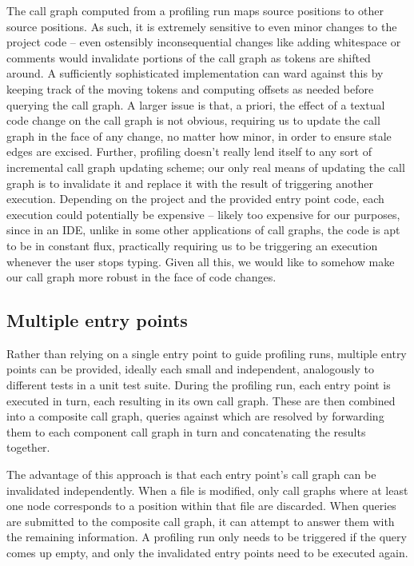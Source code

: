 The call graph computed from a profiling run maps source positions to other
source positions. As such, it is extremely sensitive to even minor changes to
the project code -- even ostensibly inconsequential changes like adding
whitespace or comments would invalidate portions of the call graph as tokens
are shifted around. A sufficiently sophisticated implementation can ward
against this by keeping track of the moving tokens and computing offsets as
needed before querying the call graph. A larger issue is that, a priori, the
effect of a textual code change on the call graph is not obvious, requiring us
to update the call graph in the face of any change, no matter how minor, in
order to ensure stale edges are excised. Further, profiling doesn't really lend
itself to any sort of incremental call graph updating scheme; our only real
means of updating the call graph is to invalidate it and replace it with the
result of triggering another execution. Depending on the project and the
provided entry point code, each execution could potentially be expensive --
likely too expensive for our purposes, since in an IDE, unlike in some other
applications of call graphs, the code is apt to be in constant flux,
practically requiring us to be triggering an execution whenever the user stops
typing. Given all this, we would like to somehow make our call graph more
robust in the face of code changes.

\subsection{Multiple entry points}

Rather than relying on a single entry point to guide profiling runs, multiple
entry points can be provided, ideally each small and independent, analogously
to different tests in a unit test suite. During the profiling run, each entry
point is executed in turn, each resulting in its own call graph. These are then
combined into a composite call graph, queries against which are resolved by
forwarding them to each component call graph in turn and concatenating the
results together.

The advantage of this approach is that each entry point's call graph can be
invalidated independently. When a file is modified, only call graphs where at
least one node corresponds to a position within that file are discarded. When
queries are submitted to the composite call graph, it can attempt to answer
them with the remaining information. A profiling run only needs to be triggered
if the query comes up empty, and only the invalidated entry points need to be
executed again.

